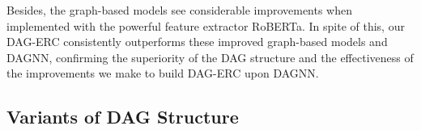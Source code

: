 \documentclass[11pt,a4paper]{article}
\begin{document}
Besides, the graph-based models see considerable improvements when implemented with the powerful feature extractor RoBERTa.
In spite of this, our DAG-ERC consistently outperforms these improved graph-based models and DAGNN, confirming the superiority of the DAG structure and the effectiveness of the improvements we make to build DAG-ERC upon DAGNN.


\begin{table}[t]
	\centering
	\caption{Overall performance on the four datasets.}
	\label{tab:overall}
\end{table}




\subsection{Variants of DAG Structure}\label{sec:variants}
\end{document}
